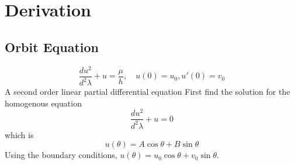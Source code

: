 % 

\section{Derivation}
\label{sec:derive}

\subsection{Orbit Equation}
\begin{equation}
	\frac{d u^{2}}{d^{2} \lambda} + u = \frac{\mu}{h}, \quad u(0) = u_{0}, u'(0) = v_{0}
\label{eq:forced-oscillator}
\end{equation}
A second order linear partial differential equation \cite{boyce2021elementary}
First find the solution for the homogenous equation
\begin{equation}
	\frac{d u^{2}}{d^{2} \lambda} + u =0
\label{eq:unforced-oscillator}
\end{equation}
which is
\begin{equation}
	u(\theta) = A \cos \theta + B \sin \theta
\label{eq:homogenous}
\end{equation}
Using the boundary conditions, $u(\theta) = u_{0} \cos \theta + v_{0} \sin \theta$.

